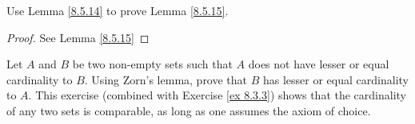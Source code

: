 \begin{exercise}\label{ex 8.5.14}
    Use Lemma \ref{8.5.14} to prove Lemma \ref{8.5.15}.
\end{exercise}

\begin{proof}
    See Lemma \ref{8.5.15}
\end{proof}

\begin{exercise}\label{ex 8.5.15}
    Let \(A\) and \(B\) be two non-empty sets such that \(A\) does not have lesser or equal cardinality to \(B\).
    Using Zorn's lemma, prove that \(B\) has lesser or equal cardinality to \(A\).
    This exercise (combined with Exercise \ref{ex 8.3.3}) shows that the cardinality of any two sets is comparable, as long as one assumes the axiom of choice.
\end{exercise}


